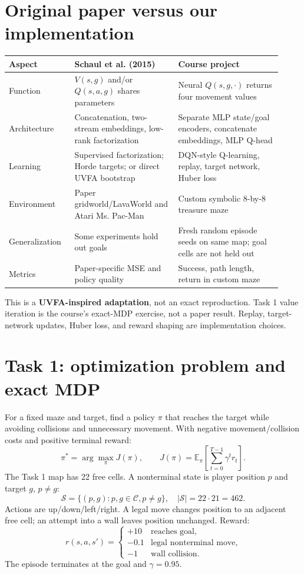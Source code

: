 \documentclass[11pt,a4paper]{article}
\begin{document}
\section{Original paper versus our implementation}
\begin{center}
\small
\begin{tabular}{p{0.22\linewidth}p{0.35\linewidth}p{0.35\linewidth}}
\toprule
Aspect & Schaul et al. (2015) & Course project\\
\midrule
Function & $V(s,g)$ and/or $Q(s,a,g)$ shares parameters & Neural $Q(s,g,\cdot)$ returns four movement values\\
Architecture & Concatenation, two-stream embeddings, low-rank factorization & Separate MLP state/goal encoders, concatenate embeddings, MLP Q-head\\
Learning & Supervised factorization; Horde targets; or direct UVFA bootstrap & DQN-style Q-learning, replay, target network, Huber loss\\
Environment & Paper gridworld/LavaWorld and Atari Ms. Pac-Man & Custom symbolic 8-by-8 treasure maze\\
Generalization & Some experiments hold out goals & Fresh random episode seeds on same map; goal cells are not held out\\
Metrics & Paper-specific MSE and policy quality & Success, path length, return in custom maze\\
\bottomrule
\end{tabular}
\end{center}
This is a \textbf{UVFA-inspired adaptation}, not an exact reproduction. Task 1 value iteration is the course's exact-MDP exercise, not a paper result. Replay, target-network updates, Huber loss, and reward shaping are implementation choices.

\section{Task 1: optimization problem and exact MDP}

For a fixed maze and target, find a policy $\pi$ that reaches the target while avoiding collisions and unnecessary movement. With negative movement/collision costs and positive terminal reward:
\[
\pi^*=\arg\max_\pi J(\pi),\qquad
J(\pi)=\mathbb{E}_\pi\left[\sum_{t=0}^{T-1}\gamma^t r_t\right].
\]
The Task 1 map has 22 free cells. A nonterminal state is player position $p$ and target $g$, $p\ne g$:
\[
\mathcal{S}=\{(p,g):p,g\in\mathcal{C},p\ne g\},\quad
|\mathcal{S}|=22\cdot21=462.
\]
Actions are up/down/left/right. A legal move changes position to an adjacent free cell; an attempt into a wall leaves position unchanged. Reward:
\[
r(s,a,s')=\begin{cases}
+10 & \text{reaches goal},\\
-0.1 & \text{legal nonterminal move},\\
-1 & \text{wall collision}.
\end{cases}
\]
The episode terminates at the goal and $\gamma=0.95$.
\end{document}
